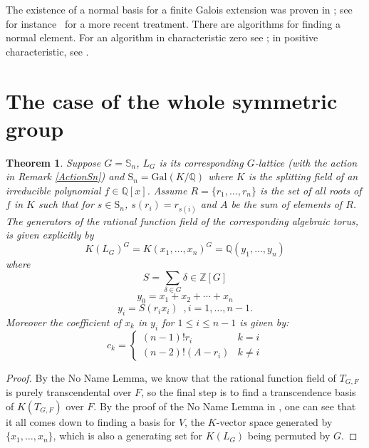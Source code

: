 \documentclass[12pt]{article}
\theoremstyle{plain}
\newtheorem{theorem}{Theorem}
\newcommand{\Z}{\ensuremath{\mathbb{Z}}}
\newcommand{\Q}{\ensuremath{\mathbb{Q}}}
\begin{document}
The existence of a normal basis for a finite Galois extension was
proven in \cite{NoetherNormalBasis,Deuring}; see for
instance~\cite[Theorem 6.13.1]{Lang} for a more recent treatment.
There are algorithms for finding a normal element. For an algorithm in
characteristic zero see \cite{Girstmair}; in positive characteristic,
see \cite{Giesbrecht,Poli}.

\section{The case of the whole symmetric group}
 


\begin{theorem}\label{specialcase}
  Suppose $G = \mathbb{S}_n$, $L_G$ is its corresponding $G$-lattice
  (with the action in Remark \ref{ActionSn}) and $ \mathrm{S}_n =
  \mathrm{Gal}(K/\Q)$ where $K$ is the splitting field of an
  irreducible polynomial $ f \in \Q[x]$. Assume $R = \lbrace r_1,
  \ldots, r_n \rbrace$ is the set of all roots of $f$ in $K$ such that
  for $s \in \mathrm{S}_n$, $s(r_i) = r_{s(i)}$ and $A$ be the sum of
  elements of $R$. The generators of the rational function field of
  the corresponding algebraic torus, is given explicitly by$$K(L_G)^G
  = K(x_1, \ldots, x_n)^G = \Q(y_1, \ldots, y_n) $$ where $$S=
  \sum_{\delta \in G} \delta \in \Z[G]$$
  $$y_0 = x_1+ x_2+ \cdots + x_n$$
  $$ y_i = S(r_ix_i) \,\,\, , i = 1, \ldots, n-1.$$ Moreover the
  coefficient of $x_k$ in $y_i$ for $1 \leq i \leq n-1$ is given by:$$
  c_k = \begin{cases} (n-1)!r_i & k=i \\ (n-2)!(A-r_i) & k\neq
    i \end{cases}$$
\end{theorem}
\begin{proof}
  By the No Name Lemma, we know that the rational function field of
  $T_{G,F}$ is purely transcendental over $F$, so the final step is to
  find a transcendence basis of $K(T_{G,F})$ over $F$. By the proof of
  the No Name Lemma in \cite{Lenstra}, one can see that it all comes
  down to finding a basis for $V$, the $K$-vector space generated by
  $\lbrace x_1, \ldots, x_n \rbrace$, which is also a generating set
  for $K(L_G)$ being permuted by $G$.
\end{proof}
\end{document}
